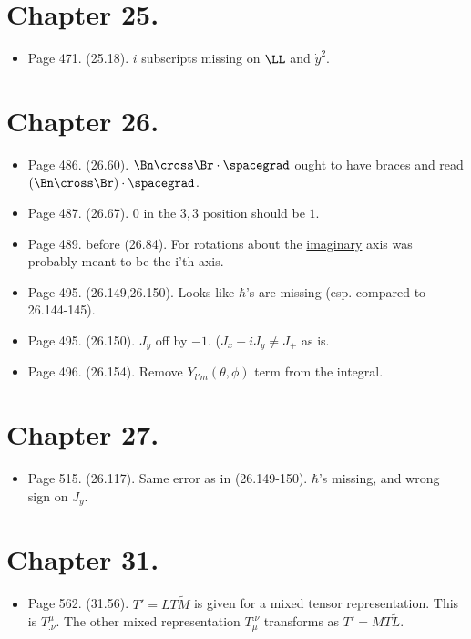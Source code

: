 \section{Chapter 25.}
\begin{itemize}
\item Page 471.  (25.18).  $i$ subscripts missing on $\LL$ and $\dot{y}^2$.
\end{itemize}

\section{Chapter 26.}
\begin{itemize}
\item Page 486.  (26.60).  $\Bn \cross \Br \cdot \spacegrad$ ought to have braces and read $(\Bn \cross \Br) \cdot \spacegrad$.
\item Page 487.  (26.67).  $0$ in the $3,3$ position should be $1$.
\item Page 489.  before (26.84).  For rotations about the \underline{imaginary} axis was probably meant to be the i'th axis.
\item Page 495.  (26.149,26.150).  Looks like $\hbar$'s are missing (esp. compared to 26.144-145).
\item Page 495.  (26.150).  $J_y$ off by $-1$. ($J_x + iJ_y \ne J_{+}$ as is.
\item Page 496.  (26.154).  Remove $Y_{l'm}(\theta, \phi)$ term from the integral.
\end{itemize}

\section{Chapter 27.}
\begin{itemize}
\item Page 515.  (26.117).  Same error as in (26.149-150).  $\hbar$'s missing, and wrong sign on $J_y$.
\end{itemize}

\section{Chapter 31.}
\begin{itemize}
\item Page 562.  (31.56).  $T' = L T \tilde{M}$ is given for a mixed tensor representation.  This is $T^\mu_{.\nu}$.  The other mixed representation $T_{\mu}^{.\nu}$ transforms as $T' = M T \tilde{L}$.
\end{itemize}

